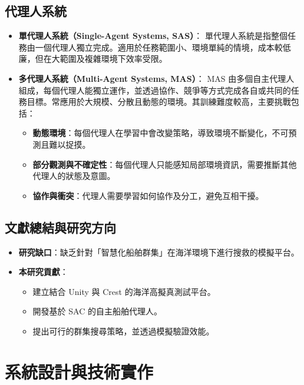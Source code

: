 \documentclass[12pt,a4paper]{article}
\begin{document}
\newpage

\subsection{代理人系統}

\begin{itemize}
  \item \textbf{單代理人系統（Single-Agent Systems, SAS）}\cite{DiffAgent}：
  單代理人系統是指整個任務由一個代理人獨立完成。適用於任務範圍小、環境單純的情境，成本較低廉，但在大範圍及複雜環境下效率受限。
  
  \item \textbf{多代理人系統（Multi-Agent Systems, MAS）}：
  MAS 由多個自主代理人組成，每個代理人能獨立運作，並透過協作、競爭等方式完成各自或共同的任務目標。常應用於大規模、分散且動態的環境\cite{MultiAgent}。其訓練難度較高，主要挑戰包括\cite{MultiChallenge}：
  \begin{itemize}
    \item \textbf{動態環境}：每個代理人在學習中會改變策略，導致環境不斷變化，不可預測且難以捉摸。
    \item \textbf{部分觀測與不確定性}：每個代理人只能感知局部環境資訊，需要推斷其他代理人的狀態及意圖。
    \item \textbf{協作與衝突}：代理人需要學習如何協作及分工，避免互相干擾。
  \end{itemize}
\end{itemize}

\subsection{文獻總結與研究方向}

\begin{itemize}
  \item \textbf{研究缺口}：缺乏針對「智慧化船舶群集」在海洋環境下進行搜救的模擬平台。
  \item \textbf{本研究貢獻}：
  \begin{itemize}
    \item 建立結合 Unity 與 Crest 的海洋高擬真測試平台。
    \item 開發基於 SAC 的自主船舶代理人。
    \item 提出可行的群集搜尋策略，並透過模擬驗證效能。
  \end{itemize}
\end{itemize}

\section{系統設計與技術實作}
\end{document}
